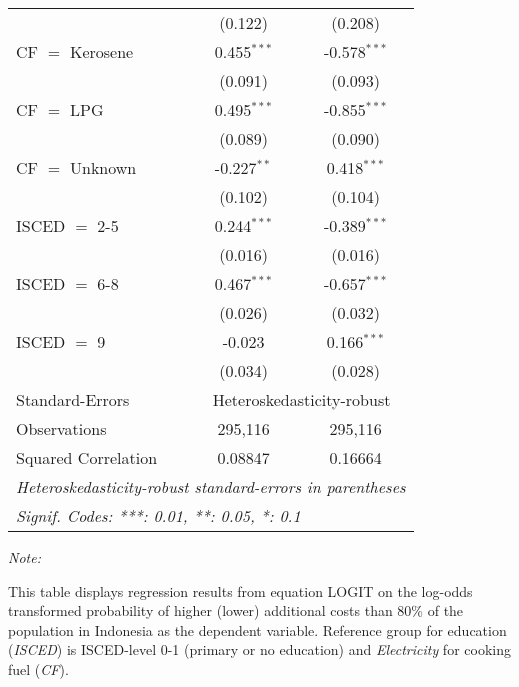 \begin{table}[htbp!]
\begin{adjustbox}{width = 1\textwidth, max height = 0.95\textheight, center}
\begin{threeparttable}[b]
\begin{tabular}{lcc}
                                 & (0.122)        & (0.208)\\   
            CF $=$ Kerosene      & 0.455$^{***}$  & -0.578$^{***}$\\   
                                 & (0.091)        & (0.093)\\   
            CF $=$ LPG           & 0.495$^{***}$  & -0.855$^{***}$\\   
                                 & (0.089)        & (0.090)\\   
            CF $=$ Unknown       & -0.227$^{**}$  & 0.418$^{***}$\\   
                                 & (0.102)        & (0.104)\\   
            ISCED $=$ 2-5        & 0.244$^{***}$  & -0.389$^{***}$\\   
                                 & (0.016)        & (0.016)\\   
            ISCED $=$ 6-8        & 0.467$^{***}$  & -0.657$^{***}$\\   
                                 & (0.026)        & (0.032)\\   
            ISCED $=$ 9          & -0.023         & 0.166$^{***}$\\   
                                 & (0.034)        & (0.028)\\   
            \midrule 
            Standard-Errors & \multicolumn{2}{c}{Heteroskedasticity-robust} \\ 
            Observations         & 295,116        & 295,116\\  
            Squared Correlation  & 0.08847        & 0.16664\\  
            \midrule \midrule
            \multicolumn{3}{l}{\emph{Heteroskedasticity-robust standard-errors in parentheses}}\\
            \multicolumn{3}{l}{\emph{Signif. Codes: ***: 0.01, **: 0.05, *: 0.1}}\\
         \end{tabular}
         
         \begin{tablenotes}\item \medskip \textit{Note:}
            \item This table displays regression results from equation LOGIT on the log-odds transformed probability of higher (lower) additional costs than 80\% of the population in Indonesia as the dependent variable. Reference group for education (\textit{ISCED}) is ISCED-level 0-1 (primary or no education) and \textit{Electricity} for cooking fuel (\textit{CF}).
         \end{tablenotes}
      \end{threeparttable}
   \end{adjustbox}
\end{table}


